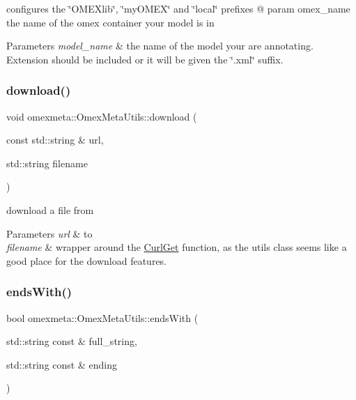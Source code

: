 configures the \char`\"{}\+O\+M\+E\+Xlib\char`\"{}, \char`\"{}my\+O\+M\+E\+X\char`\"{} and \char`\"{}local\char`\"{} prefixes @ param omex\+\_\+name the name of the omex container your model is in 


\begin{DoxyParams}{Parameters}
{\em model\+\_\+name} & the name of the model your are annotating. Extension should be included or it will be given the \char`\"{}.\+xml\char`\"{} suffix. \\
\hline
\end{DoxyParams}
\mbox{\label{classomexmeta_1_1OmexMetaUtils_a046b603d6308242b70b55de6cb72325c}} 
\subsubsection{\texorpdfstring{download()}{download()}}
{\footnotesize\ttfamily void omexmeta\+::\+Omex\+Meta\+Utils\+::download (\begin{DoxyParamCaption}\item[{const std\+::string \&}]{url,  }\item[{std\+::string}]{filename }\end{DoxyParamCaption})\hspace{0.3cm}{\ttfamily [static]}}



download a file from 


\begin{DoxyParams}{Parameters}
{\em url} & to \\
\hline
{\em filename} & wrapper around the \hyperlink{classomexmeta_1_1CurlGet}{Curl\+Get} function, as the utils class seems like a good place for the download features. \\
\hline
\end{DoxyParams}
\mbox{\label{classomexmeta_1_1OmexMetaUtils_a9c2b712b85f74fff9740477660f7b371}} 
\subsubsection{\texorpdfstring{ends\+With()}{endsWith()}}
{\footnotesize\ttfamily bool omexmeta\+::\+Omex\+Meta\+Utils\+::ends\+With (\begin{DoxyParamCaption}\item[{std\+::string const \&}]{full\+\_\+string,  }\item[{std\+::string const \&}]{ending }\end{DoxyParamCaption})\hspace{0.3cm}{\ttfamily [static]}}




